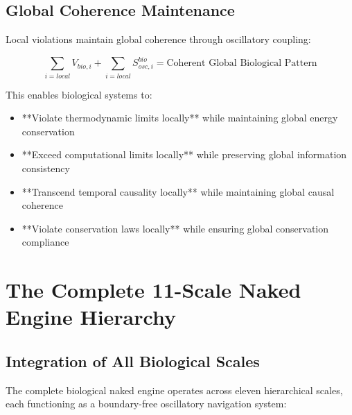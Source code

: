 \documentclass[12pt,a4paper]{article}
\begin{document}
\subsection{Global Coherence Maintenance}

Local violations maintain global coherence through oscillatory coupling:

\begin{equation}
\sum_{i=local} V_{bio,i} + \sum_{i=local} S_{osc,i}^{bio} = \text{Coherent Global Biological Pattern}
\end{equation}

This enables biological systems to:
\begin{itemize}
\item **Violate thermodynamic limits locally** while maintaining global energy conservation
\item **Exceed computational limits locally** while preserving global information consistency  
\item **Transcend temporal causality locally** while maintaining global causal coherence
\item **Violate conservation laws locally** while ensuring global conservation compliance
\end{itemize}

\section{The Complete 11-Scale Naked Engine Hierarchy}

\subsection{Integration of All Biological Scales}

The complete biological naked engine operates across eleven hierarchical scales, each functioning as a boundary-free oscillatory navigation system:
\end{document}
